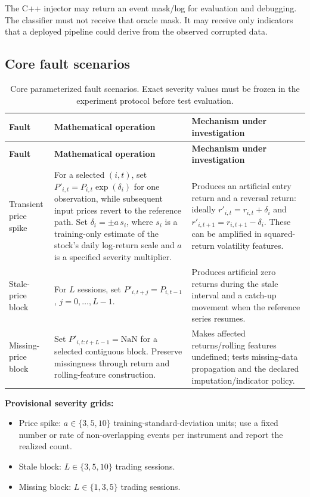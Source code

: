 \documentclass[11pt,a4paper]{article}
\begin{document}
The C++ injector may return an event mask/log for evaluation and debugging. The classifier must not receive that oracle mask. It may receive only indicators that a deployed pipeline could derive from the observed corrupted data.

\subsection{Core fault scenarios}

\begin{longtable}{p{2.6cm}p{5.4cm}p{5.8cm}}
\caption{Core parameterized fault scenarios. Exact severity values must be frozen in the experiment protocol before test evaluation.}\label{tab:faults}\\
\toprule
\textbf{Fault} & \textbf{Mathematical operation} & \textbf{Mechanism under investigation}\\
\midrule
\endfirsthead
\toprule
\textbf{Fault} & \textbf{Mathematical operation} & \textbf{Mechanism under investigation}\\
\midrule
\endhead
Transient price spike & For a selected $(i,t)$, set $P'_{i,t}=P_{i,t}\exp(\delta_i)$ for one observation, while subsequent input prices revert to the reference path. Set $\delta_i=\pm a\,s_i$, where $s_i$ is a training-only estimate of the stock's daily log-return scale and $a$ is a specified severity multiplier. & Produces an artificial entry return and a reversal return: ideally $r'_{i,t}=r_{i,t}+\delta_i$ and $r'_{i,t+1}=r_{i,t+1}-\delta_i$. These can be amplified in squared-return volatility features.\\
\addlinespace
Stale-price block & For $L$ sessions, set $P'_{i,t+j}=P_{i,t-1}$, $j=0,\ldots,L-1$. & Produces artificial zero returns during the stale interval and a catch-up movement when the reference series resumes.\\
\addlinespace
Missing-price block & Set $P'_{i,t:t+L-1}=\mathrm{NaN}$ for a selected contiguous block. Preserve missingness through return and rolling-feature construction. & Makes affected returns/rolling features undefined; tests missing-data propagation and the declared imputation/indicator policy.\\
\bottomrule
\end{longtable}

\textbf{Provisional severity grids:}
\begin{itemize}
  \item Price spike: $a\in\{3,5,10\}$ training-standard-deviation units; use a fixed number or rate of non-overlapping events per instrument and report the realized count.
  \item Stale block: $L\in\{3,5,10\}$ trading sessions.
  \item Missing block: $L\in\{1,3,5\}$ trading sessions.
\end{itemize}
\end{document}
